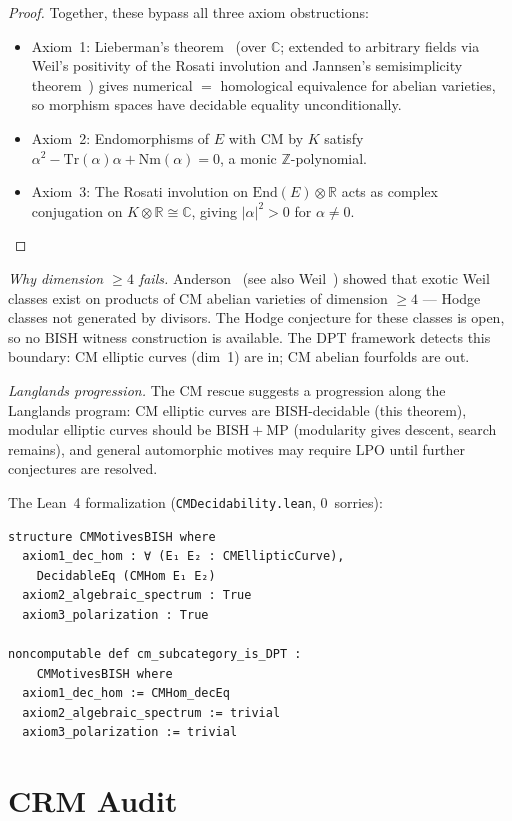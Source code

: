 \documentclass[11pt]{article}
\theoremstyle{definition}
\theoremstyle{remark}
\newcommand{\Z}{\mathbb{Z}}
\newcommand{\R}{\mathbb{R}}
\newcommand{\C}{\mathbb{C}}
\newcommand{\LPO}{\mathrm{LPO}}
\newcommand{\MP}{\mathrm{MP}}
\newcommand{\BISH}{\mathrm{BISH}}
\begin{document}
\begin{proof}
Together, these bypass all three axiom obstructions:
\begin{itemize}
\item Axiom~1: Lieberman's theorem~\cite{Lieberman1968} (over $\C$; extended to arbitrary fields via Weil's positivity of the Rosati involution and Jannsen's semisimplicity theorem~\cite{Jannsen1992}) gives numerical $=$ homological equivalence for abelian varieties, so morphism spaces have decidable equality unconditionally.
\item Axiom~2: Endomorphisms of $E$ with CM by $K$ satisfy $\alpha^2 - \mathrm{Tr}(\alpha)\alpha + \mathrm{Nm}(\alpha) = 0$, a monic $\Z$-polynomial.
\item Axiom~3: The Rosati involution on $\mathrm{End}(E) \otimes \R$ acts as complex conjugation on $K \otimes \R \cong \C$, giving $|\alpha|^2 > 0$ for $\alpha \neq 0$.
\end{itemize}
\end{proof}

\emph{Why dimension $\geq 4$ fails.} Anderson~\cite{Anderson1993} (see also Weil~\cite{Weil1977}) showed that exotic Weil classes exist on products of CM abelian varieties of dimension $\geq 4$ --- Hodge classes not generated by divisors. The Hodge conjecture for these classes is open, so no $\BISH$ witness construction is available. The DPT framework detects this boundary: CM elliptic curves (dim~1) are in; CM abelian fourfolds are out.

\emph{Langlands progression.} The CM rescue suggests a progression along the Langlands program: CM elliptic curves are $\BISH$-decidable (this theorem), modular elliptic curves should be $\BISH + \MP$ (modularity gives descent, search remains), and general automorphic motives may require $\LPO$ until further conjectures are resolved.

The Lean~4 formalization (\texttt{CMDecidability.lean}, 0~sorries):

\begin{lstlisting}
structure CMMotivesBISH where
  axiom1_dec_hom : ∀ (E₁ E₂ : CMEllipticCurve),
    DecidableEq (CMHom E₁ E₂)
  axiom2_algebraic_spectrum : True
  axiom3_polarization : True

noncomputable def cm_subcategory_is_DPT :
    CMMotivesBISH where
  axiom1_dec_hom := CMHom_decEq
  axiom2_algebraic_spectrum := trivial
  axiom3_polarization := trivial
\end{lstlisting}

\section{CRM Audit}
\label{sec:crm}
\end{document}
